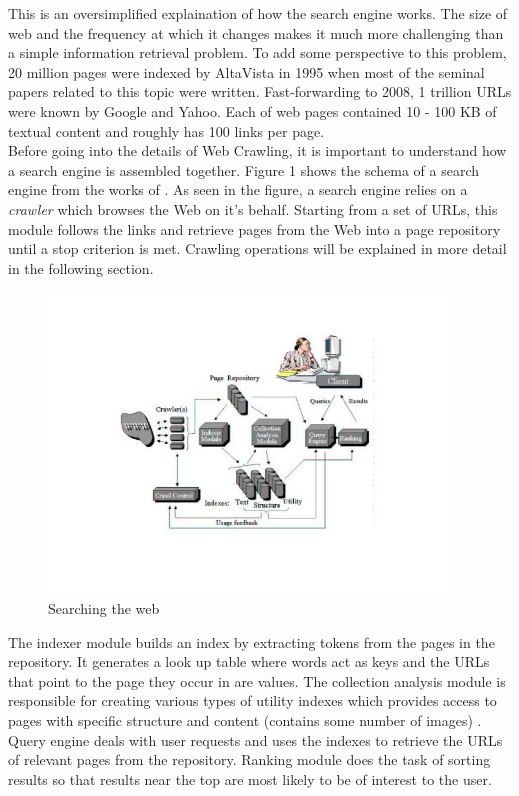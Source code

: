 \documentclass[a4paper, 11pt]{article} %
\begin{document}
This is an oversimplified explaination of how the search engine works. The size of web and the frequency at which it changes makes it much more challenging than a simple information retrieval problem. To add some perspective to this problem, 20 million pages were indexed by AltaVista in 1995 when most of the seminal papers related to this topic were written. Fast-forwarding to 2008, 1 trillion URLs were known by Google and Yahoo. Each of web pages contained 10 - 100 KB of textual content and roughly has 100 links per page. \cite{stats2008st} \\ 

Before going into the details of Web Crawling, it is important to understand how a search engine is assembled together. Figure 1 shows the schema of a search engine from the works of \cite{arasu2001searching}. As seen in the figure, a search engine relies on a \textit{crawler} which browses the Web on it's behalf. Starting from a set of URLs, this module follows the links and retrieve pages from the Web into a page repository until a stop criterion is met. Crawling operations will be explained in more detail in the following section. \\

\begin{figure} %
\begin{center}
\includegraphics[width=0.95\textwidth]{searchengine.jpg}
\end{center}
\caption{Searching the web}
\end{figure}

The indexer module builds an index by extracting tokens from the pages in the repository. It generates a look up table where words act as keys and the URLs that point to the page they occur in are values. The collection analysis module is responsible for creating various types of utility indexes which provides access to pages with specific structure and content (contains some number of images) \cite{arasu2001searching}. Query engine deals with user requests and uses the indexes to retrieve the URLs of relevant pages from the repository. Ranking module does the task of sorting results so that results near the top are most likely to be of interest to the user. \\
\end{document}
